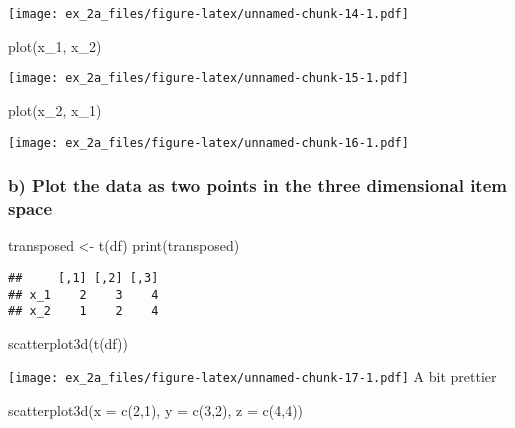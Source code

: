 \documentclass[
]{article}
\newenvironment{Shaded}{\begin{snugshade}}{\end{snugshade}}
\newcommand{\AttributeTok}[1]{\textcolor[rgb]{0.77,0.63,0.00}{#1}}
\newcommand{\DecValTok}[1]{\textcolor[rgb]{0.00,0.00,0.81}{#1}}
\newcommand{\FunctionTok}[1]{\textcolor[rgb]{0.00,0.00,0.00}{#1}}
\newcommand{\NormalTok}[1]{#1}
\newcommand{\OtherTok}[1]{\textcolor[rgb]{0.56,0.35,0.01}{#1}}
\begin{document}
\texttt{[image: ex\_2a\_files/figure-latex/unnamed-chunk-14-1.pdf]}

\begin{Shaded}
\begin{Highlighting}[]
\FunctionTok{plot}\NormalTok{(x\_1, x\_2)}
\end{Highlighting}
\end{Shaded}

\texttt{[image: ex\_2a\_files/figure-latex/unnamed-chunk-15-1.pdf]}

\begin{Shaded}
\begin{Highlighting}[]
\FunctionTok{plot}\NormalTok{(x\_2, x\_1)}
\end{Highlighting}
\end{Shaded}

\texttt{[image: ex\_2a\_files/figure-latex/unnamed-chunk-16-1.pdf]}

\hypertarget{b-plot-the-data-as-two-points-in-the-three-dimensional-item-space}{%
\subsubsection{b) Plot the data as two points in the three dimensional
item
space}\label{b-plot-the-data-as-two-points-in-the-three-dimensional-item-space}}

\begin{Shaded}
\begin{Highlighting}[]
\NormalTok{transposed }\OtherTok{\textless{}{-}} \FunctionTok{t}\NormalTok{(df)}
\FunctionTok{print}\NormalTok{(transposed)}
\end{Highlighting}
\end{Shaded}

\begin{verbatim}
##     [,1] [,2] [,3]
## x_1    2    3    4
## x_2    1    2    4
\end{verbatim}

\begin{Shaded}
\begin{Highlighting}[]
\FunctionTok{scatterplot3d}\NormalTok{(}\FunctionTok{t}\NormalTok{(df))}
\end{Highlighting}
\end{Shaded}

\texttt{[image: ex\_2a\_files/figure-latex/unnamed-chunk-17-1.pdf]} A bit
prettier

\begin{Shaded}
\begin{Highlighting}[]
\FunctionTok{scatterplot3d}\NormalTok{(}\AttributeTok{x =} \FunctionTok{c}\NormalTok{(}\DecValTok{2}\NormalTok{,}\DecValTok{1}\NormalTok{), }\AttributeTok{y =} \FunctionTok{c}\NormalTok{(}\DecValTok{3}\NormalTok{,}\DecValTok{2}\NormalTok{), }\AttributeTok{z =} \FunctionTok{c}\NormalTok{(}\DecValTok{4}\NormalTok{,}\DecValTok{4}\NormalTok{))}
\end{Highlighting}
\end{Shaded}
\end{document}
